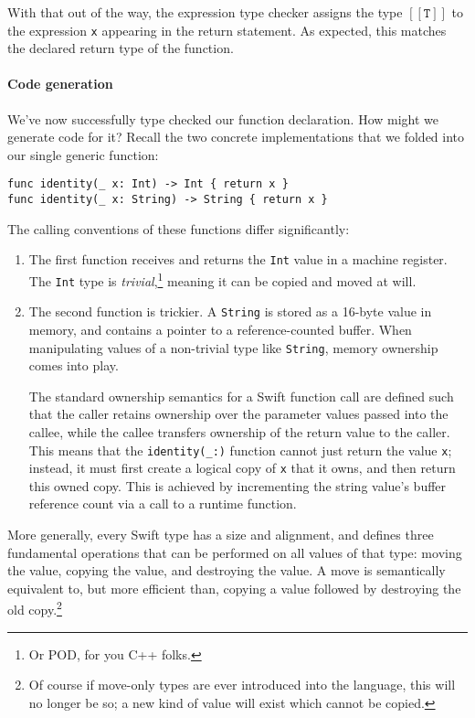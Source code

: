 \documentclass[a4paper,headsepline,bibliography=totoc,toc=flat,fleqn,twoside=semi]{scrbook}
\theoremstyle{definition}
\theoremstyle{definition}
\theoremstyle{definition}
\newcommand{\archetype}[1]{$[\![\texttt{#1}]\!]$}
\begin{document}
With that out of the way, the expression type checker assigns the type \archetype{T} to the expression \texttt{x} appearing in the return statement. As expected, this matches the declared return type of the function.

\paragraph{Code generation}
We've now successfully type checked our function declaration. How might we generate code for it? Recall the two concrete implementations that we folded into our single generic function:
\begin{Verbatim}
func identity(_ x: Int) -> Int { return x }
func identity(_ x: String) -> String { return x }
\end{Verbatim}
The calling conventions of these functions differ significantly:
\begin{enumerate}
\item The first function receives and returns the \texttt{Int} value in a machine register. The \texttt{Int} type is \emph{trivial},\footnote{Or POD, for you C++ folks.} meaning it can be copied and moved at will.
\item The second function is trickier. A \texttt{String} is stored as a 16-byte value in memory, and contains a pointer to a reference-counted buffer. When manipulating values of a non-trivial type like \texttt{String}, memory ownership comes into play.

The standard ownership semantics for a Swift function call are defined such that the caller retains ownership over the parameter values passed into the callee, while the callee transfers ownership of the return value to the caller. This means that the \verb|identity(_:)| function cannot just return the value \texttt{x}; instead, it must first create a logical copy of \texttt{x} that it owns, and then return this owned copy. This is achieved by incrementing the string value's buffer reference count via a call to a runtime function.
\end{enumerate}
More generally, every Swift type has a size and alignment, and defines three fundamental operations that can be performed on all values of that type: moving the value, copying the value, and destroying the value. A move is semantically equivalent to, but more efficient than, copying a value followed by destroying the old copy.\footnote{Of course if move-only types are ever introduced into the language, this will no longer be so; a new kind of value will exist which cannot be copied.}
\end{document}
